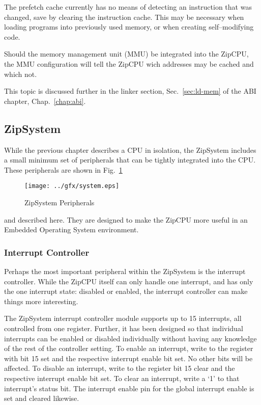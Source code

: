 \documentclass{gqtekspec}
\begin{document}
The prefetch cache currently has no means of detecting an instruction that
was changed, save by clearing the instruction cache.  This may be necessary
when loading programs into previously used memory, or when creating
self--modifying code.

Should the memory management unit (MMU) be integrated into the ZipCPU, the MMU
configuration will tell the ZipCPU wich addresses may be cached and which not.

This topic is discussed further in the linker section, Sec.~\ref{sec:ld-mem}
of the ABI chapter, Chap.~\ref{chap:abi}.


\subsection{ZipSystem}\label{sec:zipsys}

While the previous chapter describes a CPU in isolation, the ZipSystem
includes a small minimum set of peripherals that can be tightly integrated into
the CPU.  These peripherals are shown in Fig.~\ref{fig:zipsystem}
\begin{figure}\begin{center}
\texttt{[image: ../gfx/system.eps]}
\caption{ZipSystem Peripherals}\label{fig:zipsystem}
\end{center}\end{figure}
and described here.  They are designed to make
the ZipCPU more useful in an Embedded Operating System environment.

\subsubsection{Interrupt Controller}\label{sec:pic}

Perhaps the most important peripheral within the ZipSystem is the interrupt
controller.  While the ZipCPU itself can only handle one interrupt, and has
only the one interrupt state: disabled or enabled, the interrupt controller
can make things more interesting.

The ZipSystem interrupt controller module supports up to 15 interrupts, all
controlled from one register.  Further, it has been designed so that individual
interrupts can be enabled or disabled individually without having any knowledge
of the rest of the controller setting.  To enable an interrupt, write to the
register with bit 15 set and the respective interrupt
enable bit set.  No other bits will be affected.  To disable an interrupt,
write to the register bit 15 clear and the
respective interrupt enable bit set.  To clear an interrupt, write a `1' to
that interrupt's status bit.  The interrupt enable pin for the global interrupt
enable is set and cleared likewise.
\end{document}
